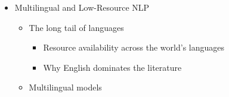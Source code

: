 \documentclass[
]{article}
\providecommand{\tightlist}{%
  \setlength{\itemsep}{0pt}\setlength{\parskip}{0pt}}
\begin{document}
\begin{itemize}
\begin{itemize}
    \begin{itemize}
    \tightlist
    \item
      Supervised fine-tuning on instructions
    \item
      Preference data and reward models
    \item
      \texttt{RLHF} and \texttt{DPO}
    \item
      Constitutional \texttt{AI} and self-critique
    \end{itemize}
  \item
    Tool use and agents

    \begin{itemize}
    \tightlist
    \item
      Function calling
    \item
      Multi-step planning
    \item
      Memory and state across turns
    \end{itemize}
  \item
    Limitations

    \begin{itemize}
    \tightlist
    \item
      Hallucination and confabulation
    \item
      Reasoning failures
    \item
      Context window constraints
    \item
      Cost and latency
    \end{itemize}
  \item
    Evaluation in the \texttt{LLM} era

    \begin{itemize}
    \tightlist
    \item
      Capability benchmarks (\texttt{MMLU}, BBH, \texttt{HumanEval})
    \item
      Quality benchmarks (\texttt{MT-Bench}, \texttt{Arena})
    \item
      Domain-specific evaluation
    \end{itemize}
  \end{itemize}
\item
  Multilingual and Low-Resource NLP

  \begin{itemize}
  \tightlist
  \item
    The long tail of languages

    \begin{itemize}
    \tightlist
    \item
      Resource availability across the world's languages
    \item
      Why English dominates the literature
    \end{itemize}
  \item
    Multilingual models


\end{itemize}
\end{itemize}
\end{document}
